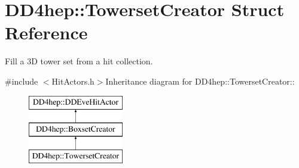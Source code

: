 \hypertarget{struct_d_d4hep_1_1_towerset_creator}{
\section{DD4hep::TowersetCreator Struct Reference}
\label{struct_d_d4hep_1_1_towerset_creator}
}


Fill a 3D tower set from a hit collection.  


{\ttfamily \#include $<$HitActors.h$>$}Inheritance diagram for DD4hep::TowersetCreator::\begin{figure}[H]
\begin{center}
\leavevmode
\includegraphics[height=3cm]{struct_d_d4hep_1_1_towerset_creator}
\end{center}
\end{figure}
